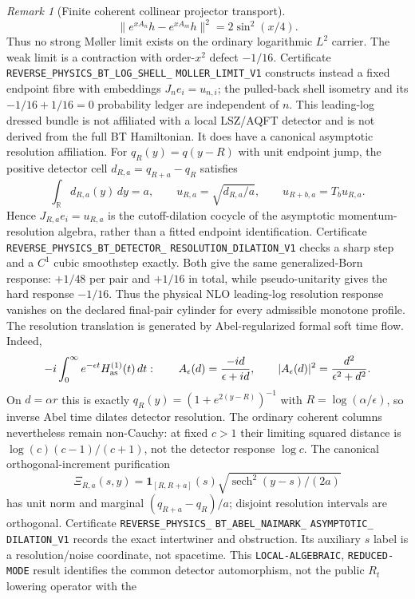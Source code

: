 \documentclass[11pt]{article}
\theoremstyle{definition}
\theoremstyle{remark}
\newtheorem{remark}[theorem]{Remark}
\begin{document}
\begin{remark}[Finite coherent collinear projector transport]
\[ \|e^{xA_n}h-e^{xA_m}h\|^2=2\sin^2(x/4).
\]
Thus no strong Møller limit exists on the ordinary logarithmic $L^2$ carrier.
The weak limit is a contraction with order-$x^2$ defect $-1/16$.  Certificate
\texttt{REVERSE\_PHYSICS\_BT\_LOG\_SHELL\_}
\allowbreak\texttt{MOLLER\_LIMIT\_V1}
constructs instead a fixed endpoint fibre with embeddings $J_ne_i=u_{n,i}$;
the pulled-back shell isometry and its $-1/16+1/16=0$ probability ledger are
independent of $n$.  This leading-log dressed bundle is not affiliated with a
local LSZ/AQFT detector and is not derived from the full BT Hamiltonian.
It does have a canonical asymptotic resolution affiliation.  For
$q_R(y)=q(y-R)$ with unit endpoint jump, the positive detector cell
$d_{R,a}=q_{R+a}-q_R$ satisfies
\[
 \int_{\mathbb R}d_{R,a}(y)\,dy=a,\qquad
 u_{R,a}=\sqrt{d_{R,a}/a},\qquad
 u_{R+b,a}=T_bu_{R,a}.
\]
Hence $J_{R,a}e_i=u_{R,a}$ is the cutoff-dilation cocycle of the asymptotic
momentum-resolution algebra, rather than a fitted endpoint identification.
Certificate
\texttt{REVERSE\_PHYSICS\_BT\_DETECTOR\_}
\allowbreak\texttt{RESOLUTION\_DILATION\_V1}
checks a sharp step and a $C^1$ cubic smoothstep exactly.  Both give the same
generalized-Born response: $+1/48$ per pair and $+1/16$ in total, while
pseudo-unitarity gives the hard response $-1/16$.  Thus the physical NLO
leading-log resolution response vanishes on the declared final-pair cylinder
for every admissible monotone profile.
The resolution translation is generated by Abel-regularized formal soft
time flow.  Indeed,
\[
 -i\int_0^\infty e^{-\epsilon t}H_{\rm as}^{(1)}(t)\,dt:
 \qquad A_\epsilon(d)=\frac{-id}{\epsilon+id},
 \qquad |A_\epsilon(d)|^2=\frac{d^2}{\epsilon^2+d^2}.
\]
On $d=\alpha r$ this is exactly
$q_R(y)=(1+e^{2(y-R)})^{-1}$ with
$R=\log(\alpha/\epsilon)$, so inverse Abel time dilates detector resolution.
The ordinary coherent columns nevertheless remain non-Cauchy: at fixed
$c>1$ their limiting squared distance is
$\log(c)(c-1)/(c+1)$, not the detector response $\log c$.  The canonical
orthogonal-increment purification
\[
 \Xi_{R,a}(s,y)=\mathbf1_{[R,R+a]}(s)
 \sqrt{\operatorname{sech}^2(y-s)/(2a)}
\]
has unit norm and marginal $(q_{R+a}-q_R)/a$; disjoint resolution intervals
are orthogonal.  Certificate
\texttt{REVERSE\_PHYSICS\_}
\allowbreak\texttt{BT\_ABEL\_NAIMARK\_}
\allowbreak\texttt{ASYMPTOTIC\_}
\allowbreak\texttt{DILATION\_V1}
records the exact intertwiner and obstruction.  Its auxiliary $s$ label is a
resolution/noise coordinate, not spacetime.  This
\texttt{LOCAL-ALGEBRAIC}, \texttt{REDUCED-MODE} result identifies the common
detector automorphism, not the public $R_t$ lowering operator with the

\end{remark}
\end{document}
